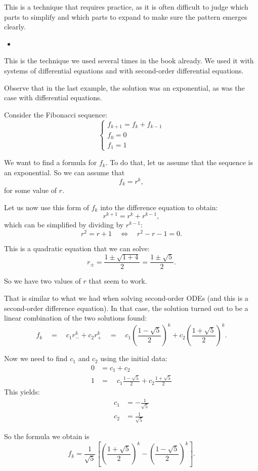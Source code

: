 This is a technique that requires practice, as it is often difficult to judge which parts to simplify and which parts to expand to make sure the pattern emerges clearly. \\

\begin{video}
\begin{itemize}
	\item {}
\end{itemize}	
\end{video}


\hfill



This is the technique we used several times in the book already. We used it with systems of differential equations and with second-order differential equations.

Observe that in the last example, the solution was an exponential, as was the case with differential equations.

\begin{example}
Consider the Fibonacci sequence:
$$
\begin{cases}
f_{k+1} = f_k + f_{k-1} \\
f_0 = 0 \\
f_1 = 1	
\end{cases}
$$

We want to find a formula for $f_k$. To do that, let us assume that the sequence is an exponential. So we can assume that
$$
f_k = r^k,
$$
for some value of $r$.

Let us now use this form of $f_k$ into the difference equation to obtain:
$$
r^{k+1} = r^k + r^{k-1},
$$
which can be simplified by dividing by $r^{k-1}$:
$$
r^2 = r + 1 \quad \Leftrightarrow \quad r^2 - r - 1 = 0.
$$

This is a quadratic equation that we can solve:
$$
r_{\pm} = \frac{1 \pm \sqrt{1 + 4}}{2} = \frac{1 \pm \sqrt{5}}{2}.
$$

So we have two values of $r$ that seem to work. 

That is similar to what we had when solving second-order ODEs (and this is a second-order difference equation).
In that case, the solution turned out to be a linear combination of the two solutions found:
$$
f_k 
	\quad = \quad  c_1 r_-^k + c_2 r_+^k
	\quad = \quad  c_1 \left(\frac{1 - \sqrt{5}}{2}\right)^k + c_2 \left(\frac{1 + \sqrt{5}}{2}\right)^k.
$$

Now we need to find $c_1$ and $c_2$ using the initial data:
\begin{align*}
0 & = c_1 + c_2
	\tag{$k=0$}	 \\
1 & = \quad  c_1 \frac{1 - \sqrt{5}}{2} + c_2 \frac{1 + \sqrt{5}}{2}
	\tag{$k=1$}
\end{align*}
This yields:
\begin{align*}
c_1 & = -\frac{1}{\sqrt{5}}\\
c_2 & = \frac{1}{\sqrt{5}}	
\end{align*}

So the formula we obtain is
$$
f_k =  \frac{1}{\sqrt{5}} \left[\left(\frac{1 + \sqrt{5}}{2}\right)^k - \left(\frac{1 - \sqrt{5}}{2}\right)^k \right].
$$
\end{example}


